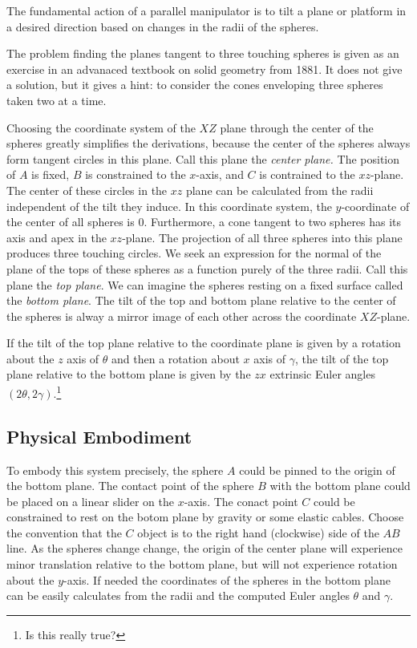 \documentclass{article}
\begin{document}
The fundamental action of a parallel manipulator is to tilt a plane or platform in a desired direction based
on changes in the radii of the spheres.

The problem finding the planes tangent to three touching spheres
is given as an exercise in an advanaced textbook on solid geometry from 1881\cite{payne1881}. It does not give a solution, but it gives a hint: to consider the cones enveloping
three spheres taken two at a time.

Choosing the coordinate system of the $XZ$ plane through the center of the spheres greatly
simplifies the derivations, because the center of the spheres always form tangent circles
in this plane. Call this plane the {\em center plane.} The position of $A$ is fixed, $B$ is constrained to the $x$-axis, and
$C$ is contrained to the $xz$-plane. The center of these circles in the $xz$ plane can be
calculated from the radii independent of the tilt they induce.
In this coordinate system, the $y$-coordinate of the center of all spheres is $0$.
Furthermore, a cone tangent to two spheres has its axis and apex in the $xz$-plane.
The projection of all three spheres into this plane produces three touching circles.
We seek an expression for the normal of the plane of the tops of these spheres as a function
purely of the three radii. Call this plane the {\em top plane}.
We can imagine the spheres resting on a fixed surface called the {\em bottom plane}.
The tilt of the top and bottom plane relative to the center of the spheres
is alway a mirror image of each other across the coordinate $XZ$-plane.

If the tilt of the top plane relative to the coordinate plane is given by a rotation about the $z$ axis of $\theta$ and
then a rotation about $x$ axis of $\gamma$, the tilt of the top plane relative
to the bottom plane is given by the $zx$ extrinsic Euler angles $(2\theta, 2\gamma)$.\footnote{Is this really true?}

\subsection{Physical Embodiment}

To embody this system precisely, the sphere $A$ could be pinned to
the origin of the bottom plane.
The contact point of the sphere $B$ with the bottom plane
could be placed on a
linear slider on the $x$-axis.
The conact point $C$ could be constrained to
rest on the botom plane by gravity or some elastic cables.
Choose the convention that the $C$ object is to the right hand
(clockwise)
side of the $AB$ line.
As the spheres
change change, the origin of the center plane will experience minor translation
relative to the bottom plane, but will not experience rotation about the $y$-axis.
If needed the coordinates of the spheres in the bottom plane can be easily
calculates from the radii and the computed Euler angles $\theta$ and $\gamma$.
\end{document}
